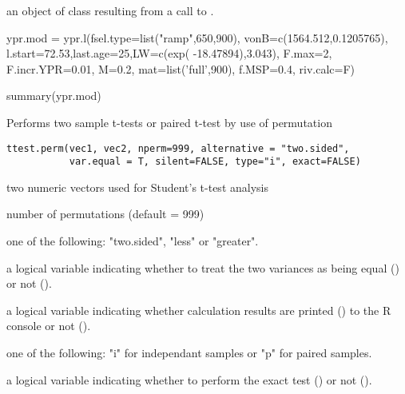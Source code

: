 \documentclass[a4paper]{book}
\begin{document}
%
\begin{Arguments}
\begin{ldescription}
\item[\code{object}] an object of class  resulting from a
call to .

\end{ldescription}
\end{Arguments}
%
\begin{Examples}
\begin{ExampleCode}
ypr.mod = ypr.l(fsel.type=list("ramp",650,900), vonB=c(1564.512,0.1205765), 
                l.start=72.53,last.age=25,LW=c(exp( -18.47894),3.043), F.max=2,
                F.incr.YPR=0.01, M=0.2, mat=list('full',900), f.MSP=0.4, riv.calc=F)  

summary(ypr.mod)
\end{ExampleCode}
\end{Examples}
\newpage
{}
%
\begin{Description}\relax
Performs two sample t-tests  or paired t-test by use of permutation
\end{Description}
%
\begin{Usage}
\begin{verbatim}
ttest.perm(vec1, vec2, nperm=999, alternative = "two.sided",
           var.equal = T, silent=FALSE, type="i", exact=FALSE)
\end{verbatim}
\end{Usage}
%
\begin{Arguments}
\begin{ldescription}
\item[\code{vec1, vec2 }] 
two numeric vectors used for Student's t-test analysis

\item[\code{nperm }] 
number of permutations (default = 999)

\item[\code{alternative }] 
one of the following: "two.sided", "less" or "greater".

\item[\code{var.equal }] 
a logical variable indicating whether to treat the two variances as being equal () or not ().

\item[\code{silent }] 
a logical variable indicating whether calculation results are printed () to the R console or not ().

\item[\code{type }] 
one of the following: "i" for independant samples or "p" for paired samples.

\item[\code{exact }] 
a logical variable indicating whether to perform the exact test () or not ().

\end{ldescription}
\end{Arguments}
\end{document}
